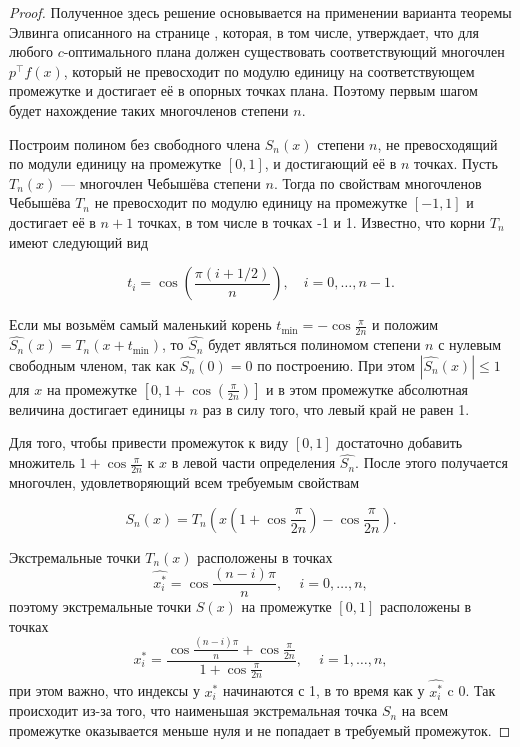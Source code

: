 \documentclass[specialist,
               substylefile = spbu.rtx,
               subf,href,colorlinks=true, 12pt]{disser}
\theoremstyle{definition}
\newcommand\abs[1]{\left\lvert#1\right\rvert}
\begin{document}
	\begin{proof}

	Полученное здесь решение основывается на применении варианта теоремы Элвинга описанного на странице \pageref{th:elfving}, которая, в том числе, утверждает, что для любого $c$-оптимального плана должен существовать соответствующий многочлен $p^\top f(x)$, который не превосходит по модулю единицу на соответствующем промежутке и достигает её в опорных точках плана. Поэтому первым шагом будет нахождение таких многочленов степени $n$.
	
	Построим полином без свободного члена $S_n(x)$ степени $n$, не превосходящий по модули единицу на промежутке $[0, 1]$, и достигающий её в $n$ точках. Пусть $T_n(x)$ --- многочлен Чебышёва степени $n$. Тогда по свойствам многочленов Чебышёва $T_n$ не превосходит по модулю единицу на промежутке $[-1, 1]$ и достигает её в $n+1$ точках, в том числе в точках -1 и 1. Известно, что корни $T_n$ имеют следующий вид
	
	\begin{equation*}
		t_{i}=\cos \left({\frac {\pi (i+1/2)}{n}}\right),\quad i=0,\ldots ,n-1.
	\end{equation*}	 
	
	Если мы возьмём самый маленький корень $t_{\text{min}} = - \cos \frac{\pi}{2n}$ и положим $\widehat{S_n}(x) = T_n(x + t_{\text{min}})$, то $\widehat{S_n}$ будет являться полиномом степени $n$ с нулевым свободным членом, так как $\widehat{S_n}(0) = 0$ по построению. При этом $\abs{\widehat{S_n}(x)} \leqslant 1$ для $x$ на промежутке $[0, 1+ \cos \left(\frac{\pi}{2n}\right)]$ и в этом промежутке абсолютная величина достигает единицы $n$ раз в силу того, что левый край не равен 1.
	
	Для того, чтобы привести промежуток к виду $[0, 1]$ достаточно добавить множитель $1 + \cos \frac{\pi}{2n}$  к $x$ в левой части определения $\widehat{S_n}$. После этого получается многочлен, удовлетворяющий всем требуемым свойствам
	
	\begin{equation*}
		S_n(x) = T_n \left(x \left(1 + \cos \frac{\pi}{2n} \right) - \cos \frac{\pi}{2n} \right).
	\end{equation*}	
	
	Экстремальные точки $T_n(x)$ расположены в точках
	\begin{equation*}
		\widehat{x_i^*} = \cos \frac{(n - i)\pi}{n}, \, \quad i = 0, \ldots, n,
	\end{equation*}
	поэтому экстремальные точки $S(x)$ на промежутке $[0, 1]$ расположены в точках
	\begin{equation*}
		x_i^* = \frac{\cos \frac{(n - i) \pi}{n} + \cos \frac{\pi}{2n}}{1 + \cos \frac{\pi}{2n}} , \, \quad i = 1, \ldots, n, 
	\end{equation*}
	при этом важно, что индексы у $x_i^*$ начинаются с 1, в то время как у $\widehat{x_i^*}$ c 0. Так происходит из-за того, что наименьшая экстремальная точка $S_n$ на всем промежутке оказывается меньше нуля и не попадает в требуемый промежуток.
	

\end{proof}
\end{document}
